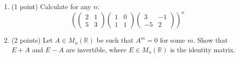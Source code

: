 \documentclass{article}
\begin{document}
\begin{enumerate}
  \item (1 point) Calculate for any $n$:
  \begin{equation*}
    \left( 
        \begin{pmatrix}
            2 & 1 \\
            5 & 3 
        \end{pmatrix}        
        \begin{pmatrix}
            1 & 0 \\
            1 & 1 
        \end{pmatrix}        
        \begin{pmatrix}
            3 & -1 \\
           -5 & 2
        \end{pmatrix}                  
    \right)^n
  \end{equation*}

  \item (2 points) Let $A \in M_n(\mathbb{R})$ be such that $A^m = 0$ for some $m$. 
  Show that $E + A$ and $E - A$ are invertible, 
  where $E \in M_n(\mathbb{R})$ is the identity matrix.
\end{enumerate}
\end{document}

